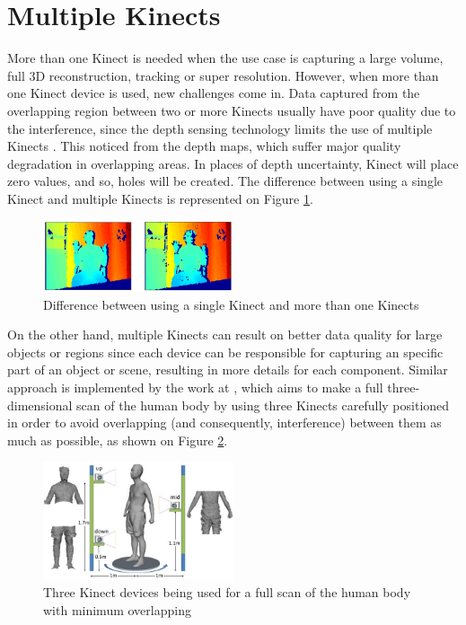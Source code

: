 \documentclass[msc, a4paper, classic, en]{ufbathesis}
\begin{document}
\section{Multiple Kinects}

More than one Kinect is needed when the use case is capturing a large volume, full 3D reconstruction, tracking or super resolution. 
However, when more than one Kinect device is used, new challenges come in. Data captured from the overlapping region between two or more Kinects usually have poor quality due to the interference, since the depth sensing technology limits the use of multiple Kinects \cite{roy}. This noticed from the depth maps, which suffer major quality degradation in overlapping areas. In places of depth uncertainty, Kinect will place zero values, and so, holes will be created. The difference between using a single Kinect and multiple Kinects is represented on Figure \ref{fig:twokin}. 

\begin{figure}
\centering
\includegraphics[width=0.5\textwidth]{images/twokin.png}
\caption{Difference between using a single Kinect and more than one Kinects}
\label{fig:twokin}
\end{figure}

On the other hand, multiple Kinects can result on better data quality for large objects or regions since each device can be responsible for capturing an specific part of an object or scene, resulting in more details for each component. Similar approach is implemented by the work at \cite{tong}, which aims to make a full three-dimensional scan of the human body by using three Kinects carefully positioned in order to avoid overlapping (and consequently, interference) between them as much as possible, as shown on Figure \ref{fig:3kin}.

\begin{figure}
\centering
\includegraphics[width=0.5\textwidth]{images/3kin.jpg}
\caption{Three Kinect devices being used for a full scan of the human body with minimum overlapping \cite{tong}}
\label{fig:3kin}
\end{figure}
\end{document}
